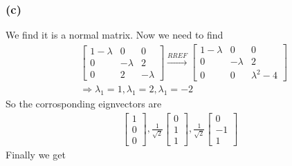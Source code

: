 \documentclass{article}
\begin{document}
\subsubsection*{(c)}
We find it is a normal matrix. Now we need to find 
\begin{equation*}
    \begin{split}
        &\begin{bmatrix}
            1 - \lambda & 0 & 0 \\ 0 & -\lambda & 2 \\ 0 & 2 & -\lambda
        \end{bmatrix} \stackrel{RREF}{\longrightarrow} \begin{bmatrix}
            1 - \lambda & 0 & 0 \\ 0 & -\lambda & 2 \\ 0 & 0 & \lambda^2 - 4
        \end{bmatrix}\\ & \Rightarrow \lambda_1 = 1, \lambda_1 = 2, \lambda_1 = -2
    \end{split} 
\end{equation*}
So the corrosponding eignvectors are\begin{equation*}
    \begin{split}
        \begin{bmatrix}
            1 \\ 0 \\ 0
        \end{bmatrix}, \frac{1}{\sqrt{2}} \begin{bmatrix}
            0 \\ 1 \\ 1
        \end{bmatrix},\frac{1}{\sqrt{2}} \begin{bmatrix}
            0 \\ -1 \\ 1
        \end{bmatrix}
    \end{split}
\end{equation*}
Finally we get 
\end{document}
